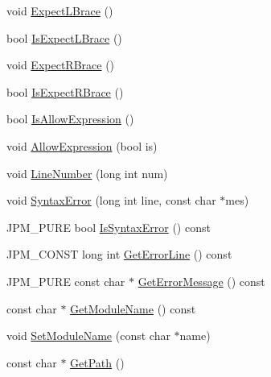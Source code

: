 \begin{DoxyCompactItemize}
\item 
void \hyperlink{classmocha_1_1_parser_tracer_af06a3714c3361b2fa11acee54cf88503}{ExpectLBrace} ()
\item 
bool \hyperlink{classmocha_1_1_parser_tracer_a5f83d9288227e7690c185389e2de6159}{IsExpectLBrace} ()
\item 
void \hyperlink{classmocha_1_1_parser_tracer_a7ccddb08ff7173af5f3baf361abaa572}{ExpectRBrace} ()
\item 
bool \hyperlink{classmocha_1_1_parser_tracer_aa9688c876936c1be1880ace55e8e24d2}{IsExpectRBrace} ()
\item 
bool \hyperlink{classmocha_1_1_parser_tracer_a1cd3550672564839bba7b97c2eec2155}{IsAllowExpression} ()
\item 
void \hyperlink{classmocha_1_1_parser_tracer_a102ec3e73afebcae53867c6189b1b8a9}{AllowExpression} (bool is)
\item 
void \hyperlink{classmocha_1_1_parser_tracer_aa9abf6b85ff1e7d830ffe32c98d67225}{LineNumber} (long int num)
\item 
void \hyperlink{classmocha_1_1_parser_tracer_a9e131cd1aeb87990121b8d93dfad5c6c}{SyntaxError} (long int line, const char $\ast$mes)
\item 
JPM\_\-PURE bool \hyperlink{classmocha_1_1_parser_tracer_a10dedf60aa72b5929216ce39053a7dd7}{IsSyntaxError} () const 
\item 
JPM\_\-CONST long int \hyperlink{classmocha_1_1_parser_tracer_ad0f8eb12c3b75e8dea5d0eac2657434d}{GetErrorLine} () const 
\item 
JPM\_\-PURE const char $\ast$ \hyperlink{classmocha_1_1_parser_tracer_af9bc88df499622ebd9c7642662661c12}{GetErrorMessage} () const 
\item 
const char $\ast$ \hyperlink{classmocha_1_1_parser_tracer_ab45ec59f75c3ffd7fc3c15ae263ddf15}{GetModuleName} () const 
\item 
void \hyperlink{classmocha_1_1_parser_tracer_ae6b8f244e48d9e4495f4c64384ef26d6}{SetModuleName} (const char $\ast$name)
\item 
const char $\ast$ \hyperlink{classmocha_1_1_parser_tracer_aac2e5dc59d52601d4b69278a04e9b221}{GetPath} ()
\end{DoxyCompactItemize}
